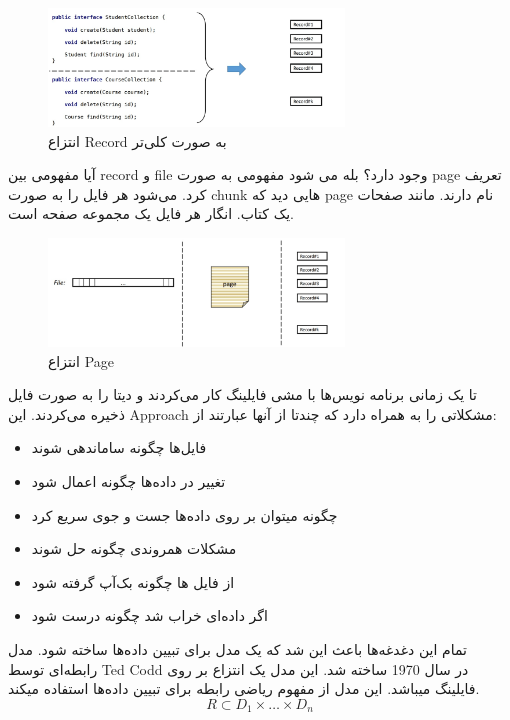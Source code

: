    \begin{figure}[H]
        \centering
        \includegraphics[width=0.7\textwidth]{source/stu3}
        \caption{انتزاع Record به صورت کلی‌تر}
    \end{figure}
   
 آیا مفهومی بین record و file وجود دارد؟ بله می شود مفهومی به صورت page تعریف کرد.
  می‌شود هر فایل را به صورت  chunk هایی دید که page نام دارند. مانند صفحات یک کتاب. انگار هر فایل یک مجموعه صفحه است.
  
  \begin{figure}[H]
        \centering
        \includegraphics[width=0.7\textwidth]{source/stu4}
        \caption{انتزاع Page}
    \end{figure}
  
  تا یک زمانی برنامه نویس‌ها با مشی فایلینگ کار می‌کردند و دیتا را به صورت فایل ذخیره می‌کردند. این Approach مشکلاتی را به همراه دارد که چندتا از آنها عبارتند از:
  \begin{itemize}
      \item فایل‌ها چگونه ساماندهی شوند
      \item تغییر در داده‌ها چگونه اعمال شود
      \item چگونه میتوان بر روی داده‌ها جست و جوی سریع کرد
      \item مشکلات همروندی چگونه حل شوند
      \item از فایل ها چگونه بک‌آپ گرفته شود
      \item اگر داده‌ای خراب شد چگونه درست شود
  \end{itemize}
  
  تمام این دغدغه‌ها باعث این شد که یک مدل برای تبیین داده‌ها ساخته شود. مدل رابطه‌ای توسط Ted Codd در سال 1970 ساخته شد. این مدل یک انتزاع بر روی فایلینگ میباشد. این مدل از مفهوم ریاضی رابطه برای تبیین داده‌ها استفاده میکند.
  $$
  R \subset D_1\times\dots\times D_n
  $$